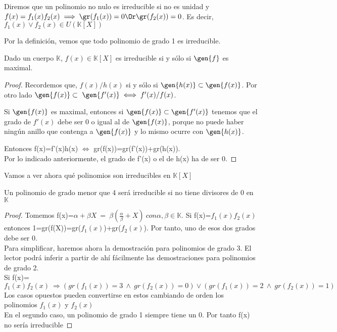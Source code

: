 \documentclass[nochap]{apuntes}
\begin{document}
\begin{defn}
 Diremos que un polinomio no nulo es irreducible si no es unidad y $f(x)=f_1(x)f_2(x) \implies \gr(f_1(x))=0 \Or  \gr(f_2(x))=0$. Es decir, $f_1(x) \vee f_2(x) \in U(\mathbb{K}[X])$
\end{defn}

Por la definición, vemos que todo polinomio de grado 1 es irreducible.

\begin{theorem}\label{thmMaximalIrreducibleK}
 Dado un cuerpo $\mathbb{K}$,  $f(x) \in \mathbb{K}[X]$  es irreducible si y sólo si $\gen{f}$ es maximal.
\end{theorem}

\begin{proof}
 Recordemos que, $f(x)/h(x)$ si y sólo si $\gen{h(x)} \subset \gen{f(x)}$. Por otro lado $\gen{f(x)} \subset \gen{f'(x)} \iff  f'(x)/f(x)$.

 Si $\gen{f(x)}$ es maximal, entonces si $\gen{f(x)} \subset \gen{f'(x)}$ tenemos que el grado de $f'(x)$ debe ser 0 o igual al de $\gen{f(x)}$, porque no puede haber ningún anillo que contenga a $\gen{f(x)}$ y lo mismo ocurre con $\gen{h(x)}$.

 Entonces f(x)=f'(x)h(x) $\Leftrightarrow$  gr(f(x))=gr(f'(x))+gr(h(x)).\\
 Por lo indicado anteriormente, el grado de f'(x) o el de h(x) ha de ser 0.
\end{proof}

Vamos a ver ahora qué polinomios son irreducibles en $\mathbb{K}[X]$\\
\begin{lemma}
 Un polinomio de grado menor que 4 será irreducible si no tiene divisores de 0 en $\mathbb{K}$
\end{lemma}
\begin{proof}
 Tomemos f(x)=$\alpha + \beta X \ = \ \beta(\frac{\alpha}{\beta}+X) \ con \alpha,\beta \in \mathbb{K}$. Si f(x)=$f_1(x)f_2(x)$  entonces 1=gr(f(X))=gr($f_1(x)$)+gr($f_2(x)$). Por tanto, uno de esos dos grados debe ser 0.\\

 Para simplificar, haremos ahora la demostración para polinomios de grado 3. El lector podrá inferir a partir de ahí fácilmente las demostraciones
 para polinomios de grado 2.\\
 Si f(x)=$f_1(x)f_2(x) \ \Rightarrow (gr(f_1(x))=3 \ \wedge \ gr(f_2(x))=0) \vee (gr(f_1(x))=2 \ \wedge \ gr(f_2(x))=1)$\\
 Los casos opuestos pueden convertirse en estos cambiando de orden los polinomios $f_1(x)$  y $f_2(x)$\\

 En el segundo caso, un polinomio de grado 1 siempre tiene un 0. Por tanto f(x) no sería irreducible
\end{proof}
\end{document}
